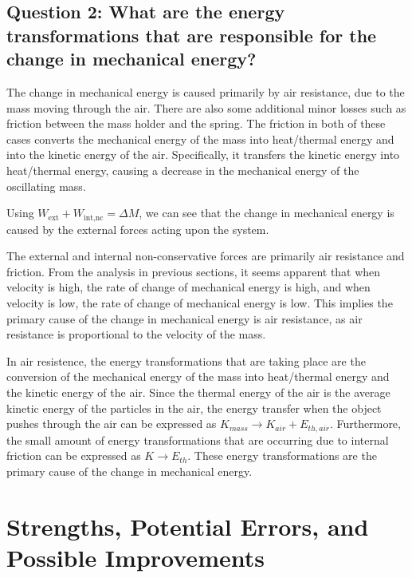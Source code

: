\documentclass[titlepage]{article}
\begin{document}
        \subsection{Question 2: What are the energy transformations that are responsible for the change in mechanical energy?}\label{subsec:question-2:-what-are-the-energy-transformations-that-are-responsible-for-the-change-in-mechanical-energy?}
            The change in mechanical energy is caused primarily by air resistance, due to the mass moving through the air.
            There are also some additional minor losses such as friction between the mass holder and the spring.
            The friction in both of these cases converts the mechanical energy of the mass into heat/thermal energy and into the kinetic energy of the air.
            Specifically, it transfers the kinetic energy into heat/thermal energy, causing a decrease in the mechanical energy of the oscillating mass.
            
            Using $W_{\text{ext}} + W_{\text{int,nc}} = \Delta M$, we can see that the change in mechanical energy is caused by the external forces acting upon the system.
            
            The external and internal non-conservative forces are primarily air resistance and friction.
            From the analysis in previous sections, it seems apparent that when velocity is high, the rate of change of mechanical energy is high, and when velocity is low, the rate of change of mechanical energy is low.
            This implies the primary cause of the change in mechanical energy is air resistance, as air resistance is proportional to the velocity of the mass.
            
            In air resistence, the energy transformations that are taking place are the conversion of the mechanical energy of the mass into heat/thermal energy and the kinetic energy of the air.
            Since the thermal energy of the air is the average kinetic energy of the particles in the air, the energy transfer when the object pushes through the air can be expressed as $K_{mass} \longrightarrow K_{air} + E_{th, air}$.
            Furthermore, the small amount of energy transformations that are occurring due to internal friction can be expressed as $K \longrightarrow E_{th}$.
    These energy transformations are the primary cause of the change in mechanical energy.
    
    \section{Strengths, Potential Errors, and Possible Improvements}\label{sec:potential-errors-next-steps-and-future-improvements}
        
\end{document}
